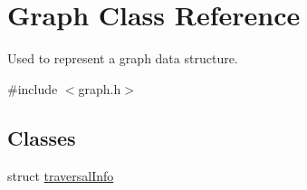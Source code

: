 \hypertarget{class_graph}{}\section{Graph Class Reference}
\label{class_graph}


Used to represent a graph data structure.  




{\ttfamily \#include $<$graph.\+h$>$}

\subsection*{Classes}
\begin{DoxyCompactItemize}
\item 
struct \hyperlink{struct_graph_1_1traversal_info}{traversal\+Info}
\end{DoxyCompactItemize}
